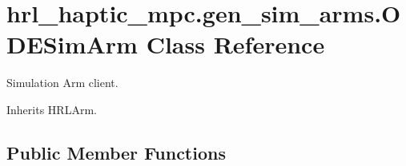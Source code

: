 \hypertarget{classhrl__haptic__mpc_1_1gen__sim__arms_1_1_o_d_e_sim_arm}{\section{hrl\-\_\-haptic\-\_\-mpc.\-gen\-\_\-sim\-\_\-arms.\-O\-D\-E\-Sim\-Arm \-Class \-Reference}
\label{classhrl__haptic__mpc_1_1gen__sim__arms_1_1_o_d_e_sim_arm}
}


\-Simulation \-Arm client.  




\-Inherits \-H\-R\-L\-Arm.

\subsection*{\-Public \-Member \-Functions}
